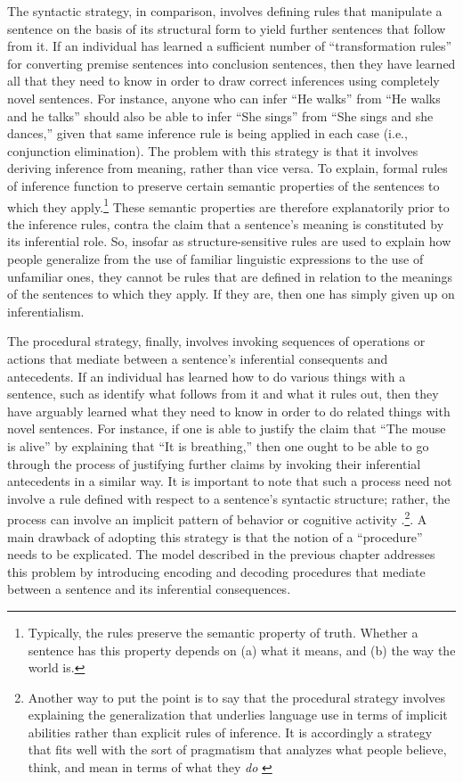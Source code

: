 The syntactic strategy, in comparison, involves defining rules that manipulate a sentence on the basis of its structural form to yield further sentences that follow from it. If an individual has learned a sufficient number of ``transformation rules'' for converting premise sentences into conclusion sentences, then they have learned all that they need to know in order to draw correct inferences using completely novel sentences. For instance, anyone who can infer ``He walks'' from ``He walks and he talks'' should also be able to infer ``She sings'' from ``She sings and she dances,'' given that same inference rule is being applied in each case (i.e., conjunction elimination). The problem with this strategy is that it involves deriving inference from meaning, rather than vice versa. To explain, formal rules of inference function to preserve certain semantic properties of the sentences to which they apply.\footnote{Typically, the rules preserve the semantic property of truth. Whether a sentence has this property depends on (a) what it means, and (b) the way the world is.} These semantic properties are therefore explanatorily prior to the inference rules, contra the claim that a sentence's meaning is constituted by its inferential role. So, insofar as structure-sensitive rules are used to explain how people generalize from the use of familiar linguistic expressions to the use of unfamiliar ones, they cannot be rules that are defined in relation to the meanings of the sentences to which they apply. If they are, then one has simply given up on inferentialism.

The procedural strategy, finally, involves invoking sequences of operations or actions that mediate between a sentence's inferential consequents and antecedents. If an individual has learned how to do various things with a sentence, such as identify what follows from it and what it rules out, then they have arguably learned what they need to know in order to do related things with novel sentences. For instance, if one is able to justify the claim that ``The mouse is alive'' by explaining that ``It is breathing,'' then one ought to be able to go through the process of justifying further claims by invoking their inferential antecedents in a similar way. It is important to note that such a process need not involve a rule defined with respect to a sentence's syntactic structure; rather, the process can involve an implicit pattern of behavior or cognitive activity \citep{Brandom:1994}.\footnote{Another way to put the point is to say that the procedural strategy involves explaining the generalization that underlies language use in terms of implicit abilities rather than explicit rules of inference. It is accordingly a strategy that fits well with the sort of pragmatism that analyzes what people believe, think, and mean in terms of what they \textit{do} \citep{Brandom:2011,Brandom:1994,Misak:2007,Misak:2013}}. A main drawback of adopting this strategy is that the notion of a ``procedure'' needs to be explicated. The model described in the previous chapter addresses this problem by introducing encoding and decoding procedures that mediate between a sentence and its inferential consequences. 

